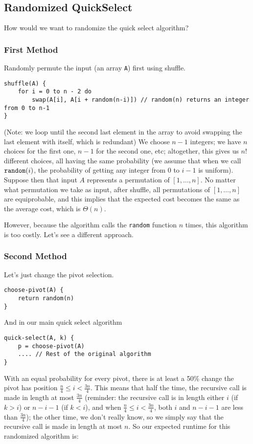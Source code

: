 \documentclass{report}
\begin{document}
\subsection{Randomized QuickSelect}
How would we want to randomize the quick select algorithm?
\subsubsection{First Method}
Randomly permute the input (an array \texttt{A}) first using shuffle.
\begin{lstlisting}
shuffle(A) {
	for i = 0 to n - 2 do
		swap(A[i], A[i + random(n-i)]) // random(n) returns an integer from 0 to n-1
}
\end{lstlisting}
(Note: we loop until the second last element in the array to avoid swapping the last element with itself, which is redundant) 
We choose $n-1$ integers; we have $n$ choices for the first one, $n-1$ for the second one, etc;
altogether, this gives us $n!$ different choices, all having the same probability
(we assume that when we call ${\tt random}(i)$, the probability of getting any integer from 0 to $i-1$ is uniform). 
Suppose then that input $A$ represents a permutation of $[1,\dots,n]$. No matter what permutation we take as input, after shuffle, 
all permutations of $[1,\dots,n]$ are equiprobable, and this implies that  the expected cost becomes the same as the average cost, which is $\Theta(n)$. 

However, because the algorithm calls the \texttt{random} function $n$ times, this algorithm is too costly. Let's see a different 
approach. 
\subsubsection{Second Method}
Let's just change the pivot selection.
\begin{lstlisting}
choose-pivot(A) {
	return random(n)
}
\end{lstlisting}
And in our main quick select algorithm
\begin{lstlisting}
quick-select(A, k) {
	p = choose-pivot(A)
	.... // Rest of the original algorithm
}
\end{lstlisting}
With an equal probability for every pivot, there is at least a 50\%
change the pivot has position $\frac{n}{4} \leq i <
\frac{3n}{4}$. This means that half the time, the recursive call is
made in length at most $\frac{3n}{4}$ (reminder: the recursive call is 
in length either $i$ (if $k > i$) or $n-i-1$ (if $k < i$),
and when $\frac{n}{4} \leq i <
\frac{3n}{4}$, both $i$ and $n-i-1$ are less than $\frac{3n}{4}$);
 the other time, we don't really know, so we simply say that the recursive call
is made in length at most $n$. So our expected runtime for this randomized algorithm is:
\end{document}
